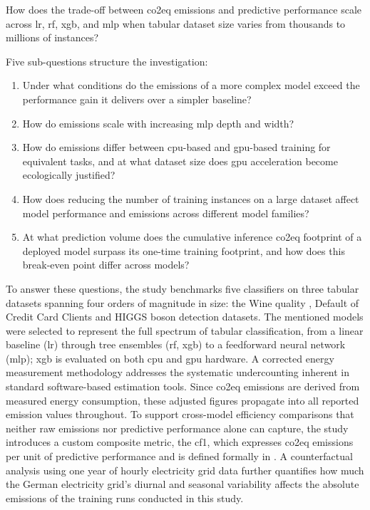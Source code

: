 \begin{researchquestion}
How does the trade-off between \acrlong{co2eq} emissions and predictive performance scale across \gls{lr}, \gls{rf}, \gls{xgb}, and \gls{mlp} when tabular dataset size varies from thousands to millions of instances?
\end{researchquestion}

Five sub-questions structure the investigation:

\begin{enumerate}[label=\textbf{RQ\arabic*.}]
    \item \label{rq:1} Under what conditions do the emissions of a more complex model exceed the performance gain it delivers over a simpler baseline?
    \item \label{rq:2} How do  emissions scale with increasing \gls{mlp} depth and width?
    \item \label{rq:3} How do emissions differ between \gls{cpu}-based and \gls{gpu}-based training for equivalent tasks, and at what dataset size does \gls{gpu} acceleration become ecologically justified?
    \item \label{rq:4} How does reducing the number of training instances on a large dataset affect model performance and emissions across different model families?
    \item \label{rq:5} At what prediction volume does the cumulative inference \gls{co2eq} footprint of a deployed model surpass its one-time training footprint, and how does this break-even point differ across models?
\end{enumerate}

To answer these questions, the study benchmarks five classifiers on three tabular datasets spanning four orders of magnitude in size: the Wine quality \parencite{stefanaeberhardWine1992}, Default of Credit Card Clients \parencite{i-chengyehDefaultCreditCard2009} and HIGGS boson detection \parencite{whitesonHIGGS2014} datasets. The mentioned models were selected to represent the full spectrum of tabular classification, from a linear baseline (\gls{lr}) through tree ensembles (\gls{rf}, \gls{xgb}) to a feedforward neural network (\gls{mlp}); \gls{xgb} is evaluated on both \gls{cpu} and \gls{gpu} hardware. A corrected energy measurement methodology addresses the systematic undercounting inherent in standard software-based estimation tools. Since \gls{co2eq} emissions are derived from measured energy consumption, these adjusted figures propagate into all reported emission values throughout. To support cross-model efficiency comparisons that neither raw emissions nor predictive performance alone can capture, the study introduces a custom composite metric, the \gls{cf1}, which expresses \gls{co2eq} emissions per unit of predictive performance and is defined formally in . A counterfactual analysis using one year of hourly electricity grid data further quantifies how much the German electricity grid's diurnal and seasonal variability affects the absolute emissions of the training runs conducted in this study.


